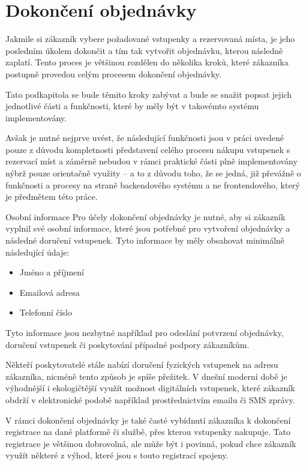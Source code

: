 \section{Dokončení objednávky}
\label{sec:identifikace-dokonceni-objednavky}
Jakmile si zákazník vybere požadované vstupenky a rezervovaná místa, je jeho posledním úkolem dokončit a tím tak vytvořit objednávku, kterou následně zaplatí.
Tento proces je většinou rozdělen do několika kroků, které zákazníka postupně provedou celým procesem dokončení objednávky.

Tato podkapitola se bude těmito kroky zabývat a bude se snažit popsat jejich jednotlivé části a funkčnosti, které by měly být v takovémto systému implementovány.

Avšak je nutné nejprve uvést, že následující funkčnosti jsou v práci uvedené pouze z důvodu kompletnosti představení celého procesu nákupu vstupenek s rezervací míst a záměrně nebudou v rámci praktické části plně implementovány nýbrž pouze orientačně využity – a to z důvodu toho, že se jedná, již převážně o funkčnosti a procesy na straně backendového systému a ne frontendového, který je předmětem této práce.

\begin{subsection}{Osobní informace}
    \label{subsec:identifikace-dokonceni-objednavky-osobni-informace}
    Pro účely dokončení objednávky je nutné, aby si zákazník vyplnil své osobní informace, které jsou potřebné pro vytvoření objednávky a následné doručení vstupenek.
    Tyto informace by měly obsahovat minimálně následující údaje:

    \begin{itemize}
        \item Jméno a příjmení
        \item Emailová adresa
        \item Telefonní číslo
    \end{itemize}

    Tyto informace jsou nezbytné například pro odeslání potvrzení objednávky, doručení vstupenek či poskytování případné podpory zákazníkům.

    Někteří poskytovatelé stále nabízí doručení fyzických vstupenek na adresu zákazníka, nicméně tento způsob je spíše přežitek.
    V dnešní moderní době je výhodnější i ekologičtější využít možnost digitálních vstupenek, které zákazník obdrží v elektronické podobě například prostřednictvím emailu či SMS zprávy.

    V rámci dokončení objednávky je také časté vybídnutí zákazníka k dokončení registrace na dané platformě či službě, přes kterou vstupenky nakupuje.
    Tato registrace je většinou dobrovolná, ale může být i povinná, pokud chce zákazník využít některé z výhod, které jsou s touto registrací spojeny.
\end{subsection}

